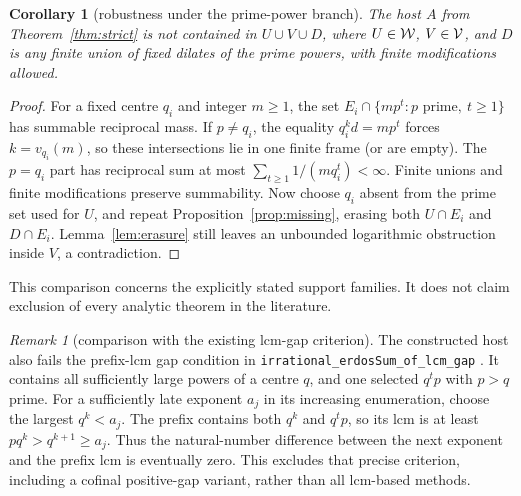\documentclass[11pt,a4paper]{article}
\newtheorem{corollary}[theorem]{Corollary}
\theoremstyle{definition}\newtheorem{definition}[theorem]{Definition}
\theoremstyle{remark}\newtheorem{remark}[theorem]{Remark}
\begin{document}
\begin{corollary}[robustness under the prime-power branch]\label{cor:primepowers}
The host $A$ from Theorem~\ref{thm:strict} is not contained in
$U\cup V\cup D$, where $U\in\mathcal W$, $V\in\mathcal V$, and $D$ is any finite union
of fixed dilates of the prime powers, with finite modifications allowed.
\end{corollary}
\begin{proof}
For a fixed centre $q_i$ and integer $m\ge1$, the set
$E_i\cap\{mp^t:p\text{ prime},\ t\ge1\}$ has summable reciprocal mass.
If $p\ne q_i$, the equality $q_i^k d=mp^t$ forces $k=v_{q_i}(m)$,
so these intersections lie in one finite frame (or are empty).
The $p=q_i$ part has reciprocal sum at most $\sum_{t\ge1}1/(mq_i^t)<\infty$.
Finite unions and finite modifications preserve summability.
Now choose $q_i$ absent from the prime set used for $U$, and repeat
Proposition~\ref{prop:missing}, erasing both $U\cap E_i$ and $D\cap E_i$.
Lemma~\ref{lem:erasure} still leaves an unbounded logarithmic obstruction
inside $V$, a contradiction.
\end{proof}
This comparison concerns the explicitly stated support families. It does
not claim exclusion of every analytic theorem in the literature.

\begin{remark}[comparison with the existing lcm-gap criterion]
The constructed host also fails the prefix-lcm gap condition in
\texttt{irrational\_erdosSum\_of\_lcm\_gap} \cite{lcmgap}.
It contains all sufficiently large powers of a centre $q$, and one selected
$q^t p$ with $p>q$ prime. For a sufficiently late exponent $a_j$ in its
increasing enumeration, choose the largest $q^k<a_j$.
The prefix contains both $q^k$ and $q^t p$, so its lcm is at least
$pq^k>q^{k+1}\ge a_j$.
Thus the natural-number difference between the next exponent and the
prefix lcm is eventually zero. This excludes that precise criterion,
including a cofinal positive-gap variant, rather than all lcm-based methods.
\end{remark}
\end{document}
